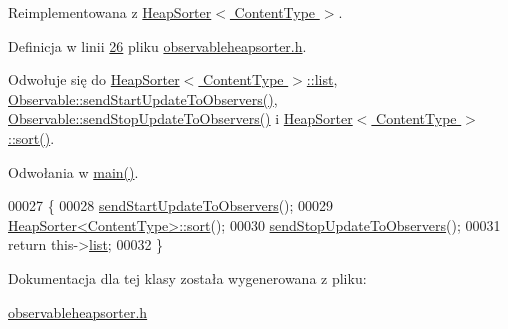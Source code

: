 Reimplementowana z \hyperlink{class_heap_sorter_a0617d40d6d46a65535e7af76f2957898}{Heap\-Sorter$<$ Content\-Type $>$}.



Definicja w linii \hyperlink{observableheapsorter_8h_source_l00026}{26} pliku \hyperlink{observableheapsorter_8h_source}{observableheapsorter.\-h}.



Odwołuje się do \hyperlink{heapsorter_8h_source_l00021}{Heap\-Sorter$<$ Content\-Type $>$\-::list}, \hyperlink{observable_8h_source_l00029}{Observable\-::send\-Start\-Update\-To\-Observers()}, \hyperlink{observable_8h_source_l00039}{Observable\-::send\-Stop\-Update\-To\-Observers()} i \hyperlink{heapsorter_8h_source_l00042}{Heap\-Sorter$<$ Content\-Type $>$\-::sort()}.



Odwołania w \hyperlink{main_8cpp_source_l00022}{main()}.


\begin{DoxyCode}
00027         \{
00028                 \hyperlink{class_observable_a78df64057f152342a43f27979186a6ba}{sendStartUpdateToObservers}();
00029                 \hyperlink{class_heap_sorter_a0617d40d6d46a65535e7af76f2957898}{HeapSorter<ContentType>::sort}();
00030                 \hyperlink{class_observable_a16f75ed1514a0cb7526b5a5d2b7ca7c6}{sendStopUpdateToObservers}();
00031                 \textcolor{keywordflow}{return} this->\hyperlink{class_heap_sorter_ae5061b641a597893a2e7f747c9cc15f2}{list};
00032         \}
\end{DoxyCode}


Dokumentacja dla tej klasy została wygenerowana z pliku\-:\begin{DoxyCompactItemize}
\item 
\hyperlink{observableheapsorter_8h}{observableheapsorter.\-h}\end{DoxyCompactItemize}
